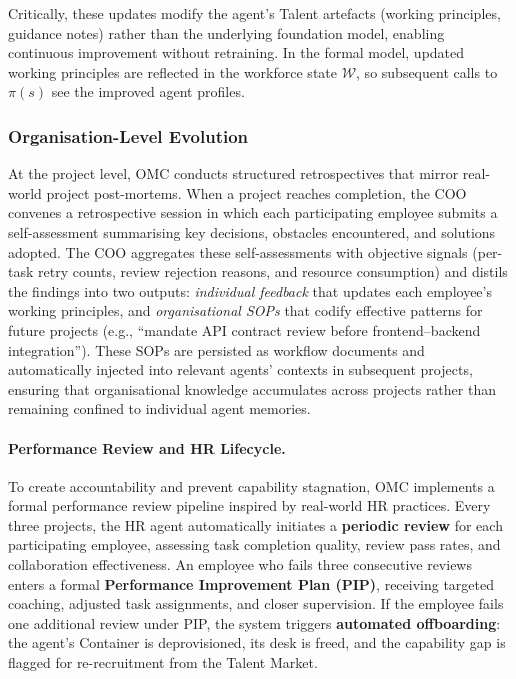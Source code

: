 \documentclass[11pt,a4paper]{article}
\begin{document}
Critically, these updates modify the agent's Talent artefacts (working principles, guidance notes) rather than the underlying foundation model, enabling continuous improvement without retraining.  In the formal model, updated working principles are reflected in the workforce state $\mathcal{W}$, so subsequent calls to $\pi(s)$ see the improved agent profiles.

\subsubsection{Organisation-Level Evolution}

At the project level, OMC conducts structured retrospectives that mirror real-world project post-mortems.  When a project reaches completion, the COO convenes a retrospective session in which each participating employee submits a self-assessment summarising key decisions, obstacles encountered, and solutions adopted.  The COO aggregates these self-assessments with objective signals (per-task retry counts, review rejection reasons, and resource consumption) and distils the findings into two outputs: \emph{individual feedback} that updates each employee's working principles, and \emph{organisational SOPs} that codify effective patterns for future projects (e.g., ``mandate API contract review before frontend--backend integration'').  These SOPs are persisted as workflow documents and automatically injected into relevant agents' contexts in subsequent projects, ensuring that organisational knowledge accumulates across projects rather than remaining confined to individual agent memories.

\paragraph{Performance Review and HR Lifecycle.} To create accountability and prevent capability stagnation, OMC implements a formal performance review pipeline inspired by real-world HR practices.  Every three projects, the HR agent automatically initiates a \textbf{periodic review} for each participating employee, assessing task completion quality, review pass rates, and collaboration effectiveness.  An employee who fails three consecutive reviews enters a formal \textbf{Performance Improvement Plan (PIP)}, receiving targeted coaching, adjusted task assignments, and closer supervision.  If the employee fails one additional review under PIP, the system triggers \textbf{automated offboarding}: the agent's Container is deprovisioned, its desk is freed, and the capability gap is flagged for re-recruitment from the Talent Market.
\end{document}
